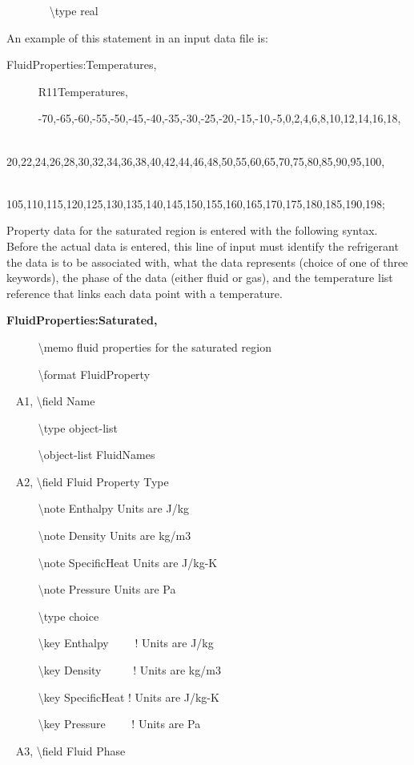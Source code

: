 ~~~~~~~ \textbackslash{}type real

An example of this statement in an input data file is:

FluidProperties:Temperatures,

~~~~~ R11Temperatures,

~~~~~ -70,-65,-60,-55,-50,-45,-40,-35,-30,-25,-20,-15,-10,-5,0,2,4,6,8,10,12,14,16,18,

~~~~~ 20,22,24,26,28,30,32,34,36,38,40,42,44,46,48,50,55,60,65,70,75,80,85,90,95,100,

~~~~~ 105,110,115,120,125,130,135,140,145,150,155,160,165,170,175,180,185,190,198;

Property data for the saturated region is entered with the following syntax.~ Before the actual data is entered, this line of input must identify the refrigerant the data is to be associated with, what the data represents (choice of one of three keywords), the phase of the data (either fluid or gas), and the temperature list reference that links each data point with a temperature.

\textbf{FluidProperties:Saturated,}

~~~~~ \textbackslash{}memo fluid properties for the saturated region

~~~~~ \textbackslash{}format FluidProperty

~ A1, \textbackslash{}field Name

~~~~~ \textbackslash{}type object-list

~~~~~ \textbackslash{}object-list FluidNames

~ A2, \textbackslash{}field Fluid Property Type

~~~~~ \textbackslash{}note Enthalpy Units are J/kg

~~~~~ \textbackslash{}note Density Units are kg/m3

~~~~~ \textbackslash{}note SpecificHeat Units are J/kg-K

~~~~~ \textbackslash{}note Pressure Units are Pa

~~~~~ \textbackslash{}type choice

~~~~~ \textbackslash{}key Enthalpy~~~~ ! Units are J/kg

~~~~~ \textbackslash{}key Density~~~~~ ! Units are kg/m3

~~~~~ \textbackslash{}key SpecificHeat ! Units are J/kg-K

~~~~~ \textbackslash{}key Pressure~~~~ ! Units are Pa

~ A3, \textbackslash{}field Fluid Phase

